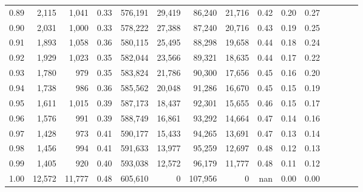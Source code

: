 \begin{tabular}{rrrcrrrrrrrrrrr}
0.89 &   2,115 &   1,041 &                                       0.33 &  576,191 &   29,419 &   86,240 &   21,716 &  0.42 &  0.20 &                         0.27 \\
0.90 &   2,031 &   1,000 &                                       0.33 &  578,222 &   27,388 &   87,240 &   20,716 &  0.43 &  0.19 &                         0.25 \\
0.91 &   1,893 &   1,058 &                                       0.36 &  580,115 &   25,495 &   88,298 &   19,658 &  0.44 &  0.18 &                         0.24 \\
0.92 &   1,929 &   1,023 &                                       0.35 &  582,044 &   23,566 &   89,321 &   18,635 &  0.44 &  0.17 &                         0.22 \\
0.93 &   1,780 &     979 &                                       0.35 &  583,824 &   21,786 &   90,300 &   17,656 &  0.45 &  0.16 &                         0.20 \\
0.94 &   1,738 &     986 &                                       0.36 &  585,562 &   20,048 &   91,286 &   16,670 &  0.45 &  0.15 &                         0.19 \\
0.95 &   1,611 &   1,015 &                                       0.39 &  587,173 &   18,437 &   92,301 &   15,655 &  0.46 &  0.15 &                         0.17 \\
0.96 &   1,576 &     991 &                                       0.39 &  588,749 &   16,861 &   93,292 &   14,664 &  0.47 &  0.14 &                         0.16 \\
0.97 &   1,428 &     973 &                                       0.41 &  590,177 &   15,433 &   94,265 &   13,691 &  0.47 &  0.13 &                         0.14 \\
0.98 &   1,456 &     994 &                                       0.41 &  591,633 &   13,977 &   95,259 &   12,697 &  0.48 &  0.12 &                         0.13 \\
0.99 &   1,405 &     920 &                                       0.40 &  593,038 &   12,572 &   96,179 &   11,777 &  0.48 &  0.11 &                         0.12 \\
1.00 &  12,572 &  11,777 &                                       0.48 &  605,610 &        0 &  107,956 &        0 &   nan &  0.00 &                         0.00 \\
\bottomrule
\end{tabular}
